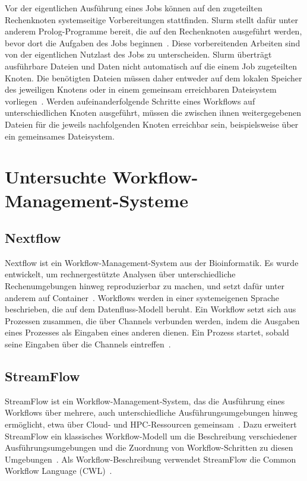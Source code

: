 Vor der eigentlichen Ausführung eines Jobs können auf den
zugeteilten Rechenknoten systemseitige Vorbereitungen stattfinden.
Slurm stellt dafür unter anderem Prolog-Programme bereit, die auf
den Rechenknoten ausgeführt werden, bevor dort die Aufgaben des
Jobs beginnen~\cite{slurmdocs-prolog}. Diese vorbereitenden
Arbeiten sind von der eigentlichen Nutzlast des Jobs zu
unterscheiden. Slurm überträgt ausführbare Dateien und Daten nicht
automatisch auf die einem Job zugeteilten Knoten. Die benötigten
Dateien müssen daher entweder auf dem lokalen Speicher des
jeweiligen Knotens oder in einem gemeinsam erreichbaren
Dateisystem vorliegen~\cite{slurmdocs-quickstart}. Werden
aufeinanderfolgende Schritte eines Workflows auf unterschiedlichen
Knoten ausgeführt, müssen die zwischen ihnen weitergegebenen
Dateien für die jeweils nachfolgenden Knoten erreichbar sein,
beispielsweise über ein gemeinsames Dateisystem.

\section{Untersuchte Workflow-Management-Systeme}
\label{sec:basics:systeme}


\subsection{Nextflow}
\label{sec:basics:nextflow}
Nextflow ist ein Workflow-Management-System aus der Bioinformatik.
Es wurde entwickelt, um rechnergestützte Analysen über
unterschiedliche Rechenumgebungen hinweg reproduzierbar zu machen,
und setzt dafür unter anderem auf
Container~\cite[S.~316]{ditommaso2017nextflow}. Workflows werden in
einer systemeigenen Sprache beschrieben, die auf dem
Datenfluss-Modell beruht. Ein Workflow setzt sich aus Prozessen
zusammen, die über Channels verbunden werden, indem die Ausgaben
eines Prozesses als Eingaben eines anderen dienen. Ein Prozess
startet, sobald seine Eingaben über die Channels
eintreffen~\cite[S.~316\,f.]{ditommaso2017nextflow}.


\subsection{StreamFlow}
\label{sec:basics:streamflow}
StreamFlow ist ein Workflow-Management-System, das die Ausführung
eines Workflows über mehrere, auch unterschiedliche Ausführungsumgebungen hinweg ermöglicht, etwa über Cloud- und HPC-Ressourcen gemeinsam~\cite[S.~1723]{colonnelli2021streamflow}. Dazu erweitert StreamFlow ein klassisches Workflow-Modell um die Beschreibung verschiedener Ausführungsumgebungen und die Zuordnung von Workflow-Schritten zu diesen Umgebungen~\cite[S.~1723]{colonnelli2021streamflow}. Als Workflow-Beschreibung verwendet StreamFlow die Common Workflow Language (CWL)~\cite[S.~1723]{colonnelli2021streamflow}.

